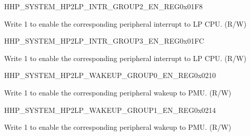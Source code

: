 {\begin{register}{H}{HP\_SYSTEM\_HP2LP\_INTR\_GROUP2\_EN\_REG}{0x01F8}\label{regdesc:HPSYSTEMHP2LPINTRGROUP2ENREG}
%
\regnewline%
\begin{regdesc}\begin{reglist}
\label{fielddesc:HPSYSTEMH2LPINTRGROUP2EN}\item [HP\_SYSTEM\_H2LP\_INTR\_GROUP2\_EN] Write 1 to enable the corresponding peripheral interrupt to LP CPU. (R/W)
\end{reglist}\end{regdesc}
\end{register}


\begin{register}{H}{HP\_SYSTEM\_HP2LP\_INTR\_GROUP3\_EN\_REG}{0x01FC}\label{regdesc:HPSYSTEMHP2LPINTRGROUP3ENREG}
%
%
\regnewline%
\begin{regdesc}\begin{reglist}
\label{fielddesc:HPSYSTEMH2LPINTRGROUP3EN}\item [HP\_SYSTEM\_H2LP\_INTR\_GROUP3\_EN] Write 1 to enable the corresponding peripheral interrupt to LP CPU. (R/W)
\end{reglist}\end{regdesc}
\end{register}


\begin{register}{H}{HP\_SYSTEM\_HP2LP\_WAKEUP\_GROUP0\_EN\_REG}{0x0210}\label{regdesc:HPSYSTEMHP2LPWAKEUPGROUP0ENREG}
%
\regnewline%
\begin{regdesc}\begin{reglist}
\label{fielddesc:HPSYSTEMH2LPWAKEUPGROUP0EN}\item [HP\_SYSTEM\_H2LP\_WAKEUP\_GROUP0\_EN] Write 1 to enable the corresponding peripheral wakeup to PMU. (R/W)
\end{reglist}\end{regdesc}
\end{register}


\begin{register}{H}{HP\_SYSTEM\_HP2LP\_WAKEUP\_GROUP1\_EN\_REG}{0x0214}\label{regdesc:HPSYSTEMHP2LPWAKEUPGROUP1ENREG}
%
\regnewline%
\begin{regdesc}\begin{reglist}
\label{fielddesc:HPSYSTEMH2LPWAKEUPGROUP1EN}\item [HP\_SYSTEM\_H2LP\_WAKEUP\_GROUP1\_EN] Write 1 to enable the corresponding peripheral wakeup to PMU. (R/W)
\end{reglist}\end{regdesc}
\end{register}


}
